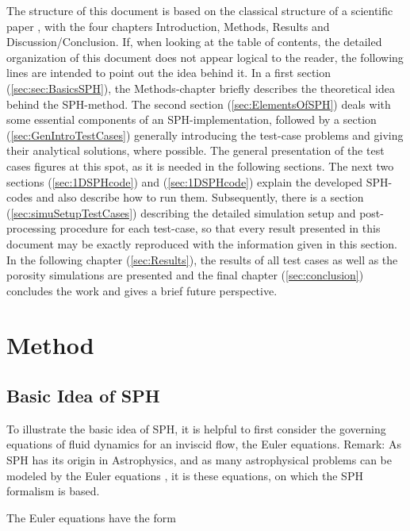 \documentclass{report}
\begin{document}
The structure of this document is based on the classical structure of a scientific paper \cite{Day2006}, with the four chapters Introduction, Methods, Results and Discussion/Conclusion. If, when looking at the table of contents, the detailed organization of this document does not appear logical to the reader, the following lines are intended to point out the idea behind it.
In a first section (\ref{sec:sec:BasicsSPH}), the Methods-chapter briefly describes the theoretical idea behind the SPH-method. The second section (\ref{sec:ElementsOfSPH}) deals with some essential components of an SPH-implementation, followed by a section (\ref{sec:GenIntroTestCases}) generally introducing the test-case problems and giving their analytical solutions, where possible. The general presentation of the test cases figures at this spot, as it is needed in the following sections. The next two sections (\ref{sec:1DSPHcode}) and (\ref{sec:1DSPHcode}) explain the developed SPH-codes and also describe how to run them. Subsequently, there is a section (\ref{sec:simuSetupTestCases}) describing the detailed simulation setup and post-processing procedure for each test-case, so that every result presented in this document may be exactly reproduced with the information given in this section.
In the following chapter (\ref{sec:Results}), the results of all test cases as well as the porosity simulations are presented and the final chapter (\ref{sec:conclusion}) concludes the work and gives a brief future perspective.

\chapter{Method}
\label{sec:method}
\section{Basic Idea of SPH}
\label{sec:BasicsSPH}

To illustrate the basic idea of SPH, it is helpful to first consider the
governing equations of fluid dynamics for an inviscid flow, the Euler equations. Remark: As SPH has its origin in Astrophysics, and as many astrophysical problems can be modeled by the Euler equations \cite{Liu2003}, it is these equations, on which the SPH formalism is based. 


The Euler equations have the form~\cite{Monaghan2005}
\end{document}
